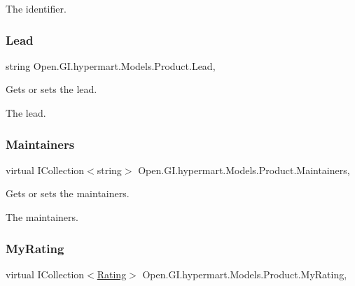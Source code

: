 The identifier. \hypertarget{class_open_1_1_g_i_1_1hypermart_1_1_models_1_1_product_a646bc5e183ba8d87c06d290398e6bee6}{}\label{class_open_1_1_g_i_1_1hypermart_1_1_models_1_1_product_a646bc5e183ba8d87c06d290398e6bee6} 
\subsubsection{\texorpdfstring{Lead}{Lead}}
{\footnotesize\ttfamily string Open.\+G\+I.\+hypermart.\+Models.\+Product.\+Lead\hspace{0.3cm}{\ttfamily [get]}, {\ttfamily [set]}}



Gets or sets the lead. 

The lead. \hypertarget{class_open_1_1_g_i_1_1hypermart_1_1_models_1_1_product_af39b6e12bee2265db7bbca5ecbeb116c}{}\label{class_open_1_1_g_i_1_1hypermart_1_1_models_1_1_product_af39b6e12bee2265db7bbca5ecbeb116c} 
\subsubsection{\texorpdfstring{Maintainers}{Maintainers}}
{\footnotesize\ttfamily virtual I\+Collection$<$string$>$ Open.\+G\+I.\+hypermart.\+Models.\+Product.\+Maintainers\hspace{0.3cm}{\ttfamily [get]}, {\ttfamily [set]}}



Gets or sets the maintainers. 

The maintainers. \hypertarget{class_open_1_1_g_i_1_1hypermart_1_1_models_1_1_product_ac4dbb116d11b4c02f51d0ce0adf33bf2}{}\label{class_open_1_1_g_i_1_1hypermart_1_1_models_1_1_product_ac4dbb116d11b4c02f51d0ce0adf33bf2} 
\subsubsection{\texorpdfstring{My\+Rating}{MyRating}}
{\footnotesize\ttfamily virtual I\+Collection$<$\hyperlink{class_open_1_1_g_i_1_1hypermart_1_1_models_1_1_rating}{Rating}$>$ Open.\+G\+I.\+hypermart.\+Models.\+Product.\+My\+Rating\hspace{0.3cm}{\ttfamily [get]}, {\ttfamily [set]}}



